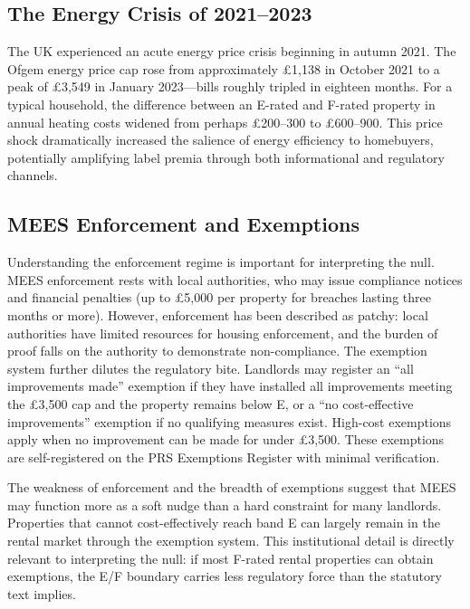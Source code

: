 \documentclass[12pt]{article}
\begin{document}
\subsection{The Energy Crisis of 2021--2023}

The UK experienced an acute energy price crisis beginning in autumn 2021. The Ofgem energy price cap rose from approximately \pounds 1,138 in October 2021 to a peak of \pounds 3,549 in January 2023---bills roughly tripled in eighteen months. For a typical household, the difference between an E-rated and F-rated property in annual heating costs widened from perhaps \pounds 200--300 to \pounds 600--900. This price shock dramatically increased the salience of energy efficiency to homebuyers, potentially amplifying label premia through both informational and regulatory channels.

\subsection{MEES Enforcement and Exemptions}

Understanding the enforcement regime is important for interpreting the null. MEES enforcement rests with local authorities, who may issue compliance notices and financial penalties (up to \pounds 5,000 per property for breaches lasting three months or more). However, enforcement has been described as patchy: local authorities have limited resources for housing enforcement, and the burden of proof falls on the authority to demonstrate non-compliance. The exemption system further dilutes the regulatory bite. Landlords may register an ``all improvements made'' exemption if they have installed all improvements meeting the \pounds 3,500 cap and the property remains below E, or a ``no cost-effective improvements'' exemption if no qualifying measures exist. High-cost exemptions apply when no improvement can be made for under \pounds 3,500. These exemptions are self-registered on the PRS Exemptions Register with minimal verification.

The weakness of enforcement and the breadth of exemptions suggest that MEES may function more as a soft nudge than a hard constraint for many landlords. Properties that cannot cost-effectively reach band E can largely remain in the rental market through the exemption system. This institutional detail is directly relevant to interpreting the null: if most F-rated rental properties can obtain exemptions, the E/F boundary carries less regulatory force than the statutory text implies.
\end{document}
